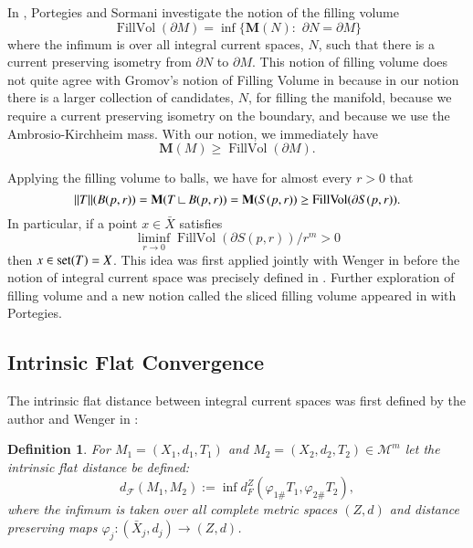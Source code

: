 \documentclass[12pt]{amsart}
\newtheorem{defn}[thm]{Definition}
\begin{document}
In \cite{Sormani-properties}, Portegies and Sormani investigate
the notion of the filling volume
\begin{equation} \label{def-fillvol}
{\operatorname{FillVol}}(\partial M)=\inf\{ {{\mathbf M}}(N): \,\, \partial N=\partial M\}
\end{equation}
where the infimum is over all integral current spaces, $N$, such that there is a current preserving isometry from 
$\partial N$ to $\partial M$.   This notion of filling volume does not quite agree
with Gromov's notion of Filling Volume in \cite{Gromov-filling} because in our
notion
there is a larger collection of candidates, $N$, for filling the manifold, because we require a current preserving isometry on the boundary, and because we use the Ambrosio-Kirchheim mass.   With our notion, we immediately have
\begin{equation}
{{\mathbf M}}(M) \ge {\operatorname{FillVol}}(\partial M).
\end{equation}

Applying the filling volume to balls, we have for almost every $r>0$ that
\begin{equation}
||T||(B(p,r))={{\mathbf M}}(T{\:\mbox{\rule{0.1ex}{1.2ex}\rule{1.1ex}{0.1ex}}\:} B(p,r))={{\mathbf M}}(S(p,r)) \ge {\operatorname{FillVol}}(\partial S(p,r)).
\end{equation}
In particular, if a point $x\in \bar{X}$ satisfies
\begin{equation}
\liminf_{r\to 0} {\operatorname{FillVol}}(\partial S(p,r))/r^m >0
\end{equation}
then $x\in {{\rm{set}}}(T)=X$.   This idea was first applied jointly with
Wenger in \cite{SorWen1}
before the notion of integral current space was precisely defined in \cite{SorWen2}.
Further exploration of filling volume and a new notion called 
the sliced filling volume appeared in \cite{Sormani-properties} with Portegies.

\vspace{.4cm}
\subsection{Intrinsic Flat Convergence} \label{subsect-int-flat}

The intrinsic flat distance between integral current spaces
was first defined by the author and Wenger in \cite{SorWen2}:

\begin{defn} \label{def-flat1} 
 For $M_1=\left(X_1,d_1,T_1\right)$ and $M_2=\left(X_2,d_2,T_2\right)\in\mathcal M^m$ let the 
intrinsic flat distance  be defined:
 \begin{equation}\label{equation:def-abstract-flat-distance}
  d_{{\mathcal F}}\left(M_1,M_2\right):=
 \inf d_F^Z
\left(\varphi_{1\#} T_1, \varphi_{2\#} T_2 \right),
 \end{equation}
where the infimum is taken over all complete metric spaces 
$\left(Z,d\right)$ and distance preserving maps 
$\varphi_j : \left(\bar{X}_j,d_j\right)\to \left(Z,d\right)$. 
\end{defn}
\end{document}
